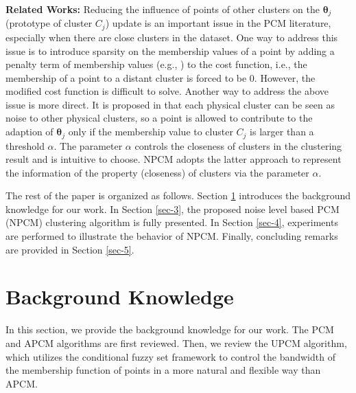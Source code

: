 \documentclass[conference]{IEEEtran}
\theoremstyle{definition}
\begin{document}
\textbf{Related Works:}
Reducing the influence of points of other clusters on the $\boldsymbol{\theta}_j$ (prototype of cluster $C_j$) update is an important issue in the PCM literature, especially when there are close clusters in the dataset. One way to address this issue is to introduce sparsity on the membership values of a point by adding a penalty term of membership values (e.g., \cite{inokuchi_sparse_2007}\cite{xenaki_sparsity-aware_2016}) to the cost function, i.e., the membership of a point to a distant cluster is forced to be $0$. However, the modified cost function is difficult to solve. Another way to address the above issue is more direct. It is proposed in \cite{hou_pcm_2016} that each physical cluster can be seen as noise to other physical clusters, so a point is allowed to contribute to the adaption of $\boldsymbol{\theta}_j$ only if the membership value to cluster $C_j$ is larger than a threshold $\alpha$. The parameter $\alpha$ controls the closeness of clusters in the clustering result and is intuitive to choose. NPCM adopts the latter approach to represent the information of the property (closeness) of clusters via the parameter $\alpha$.

The rest of the paper is organized as follows. Section \ref{sec-2} introduces the background knowledge for our work. In Section \ref{sec-3}, the proposed noise level based PCM (NPCM) clustering algorithm is fully presented. In Section \ref{sec-4}, experiments are performed to illustrate the behavior of NPCM. Finally, concluding remarks are provided in Section \ref{sec-5}.
\section{Background Knowledge}
\label{sec-2}
In this section, we provide the background knowledge for our work. The PCM and APCM algorithms are first reviewed. Then, we review the UPCM algorithm, which utilizes the conditional fuzzy set framework to control the bandwidth of the membership function of points in a more natural and flexible way than APCM.
\end{document}
